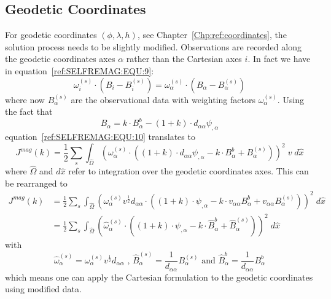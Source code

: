 \subsection{Geodetic Coordinates }
For geodetic coordinates $(\phi, \lambda, h)$, see Chapter~\ref{Chp:ref:coordinates}, the solution process needs to be slightly modified.
Observations are recorded along the geodetic coordinates axes $\alpha$ rather than the Cartesian axes $i$. In fact we
have in equation~\ref{ref:SELFREMAG:EQU:9}:
\begin{equation}\label{ref:SELFREMAG:EQU:300}
\omega^{(s)}_i \cdot (B_{i}- B^{(s)}_i) = \omega^{(s)}_{\alpha} \cdot (B_{{\alpha}}- B^{(s)}_{\alpha}) 
\end{equation} 
where now $B^{(s)}_{\alpha}$ are the observational data with weighting factors $\omega^{(s)}_{\alpha}$.  Using the 
fact that 
\begin{equation}
B_{{\alpha}} = 
 k \cdot B^b_{{\alpha}} -  (1+k) \cdot  d_{\alpha \alpha} \psi_{,\alpha} 
\end{equation}
equation~\ref{ref:SELFREMAG:EQU:10} translates to 
\begin{equation}\label{ref:SELFREMAG:EQU:301}
J^{mag}(k) = \frac{1}{2}\sum_{s} \int_{\widehat{\Omega}} 
( \omega^{(s)}_{\alpha} \cdot (
(1+k) \cdot  d_{\alpha \alpha} \psi_{,\alpha}  
 - k \cdot B^b_{{\alpha}}  + B^{(s)}_{\alpha} ) ) ^2 \; v \; d\widehat{x}
\end{equation} 
where $\widehat{\Omega}$ and $d\widehat{x}$ refer to integration over the geodetic coordinates axes. This can be rearranged to 
\begin{eqnarray}\label{ref:SELFREMAG:EQU:301bb}
J^{mag}(k)  & = \displaystyle{ \frac{1}{2}\sum_{s} \int_{\widehat{\Omega}} 
(  \omega^{(s)}_{\alpha} v^{\frac{1}{2}} d_{\alpha \alpha} \cdot ( (1+k) \cdot  
 \psi_{,\alpha} -  k \cdot v_{\alpha \alpha} B^b_{{\alpha}} + v_{\alpha \alpha} B^{(s)}_{\alpha} ) ) ^2 \; d\widehat{x} } \\
  & = \displaystyle{  \frac{1}{2}\sum_{s} \int_{\widehat{\Omega}} 
(  {\widehat{\omega}}^{(s)}_{\alpha}\cdot ( (1+k) \cdot  \psi_{,\alpha} -  k \cdot \widehat{B}^b_{{\alpha}}+  \widehat{B}^{(s)}_{\alpha} ) ) ^2 \; d\widehat{x} }
\end{eqnarray}
with 
\begin{equation}\label{ref:SELFREMAG:EQU:301b}
 \widehat{\omega}^{(s)}_{\alpha} = \omega^{(s)}_{\alpha} v^{\frac{1}{2}} d_{\alpha \alpha} \mbox{ , }
\widehat{B}^{(s)}_{\alpha}=
\frac{1}{d_{\alpha \alpha}} B^{(s)}_{\alpha}  \mbox{ and } \widehat{B}^b_{{\alpha}} = \frac{1}{d_{\alpha \alpha}}  B^b_{{\alpha}} 
\end{equation} 
which means one can apply the Cartesian formulation to the geodetic coordinates using modified data. 


